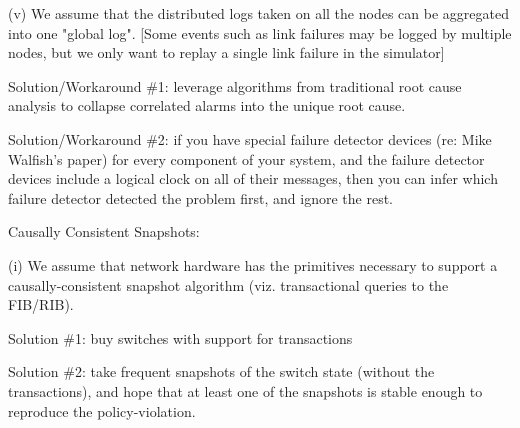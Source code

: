 (v) We assume that the distributed logs taken on all the nodes can be aggregated into one "global log". [Some events such as link failures may be logged by multiple nodes, but we only want to replay a single link failure in the simulator]

Solution/Workaround \#1: leverage algorithms from traditional root cause analysis to collapse correlated alarms into the unique root cause.

Solution/Workaround \#2: if you have special failure detector devices (re: Mike Walfish's paper) for every component of your system, and the failure detector devices include a logical clock on all of their messages, then you can infer which failure detector detected the problem first, and ignore the rest.                                                            





Causally Consistent Snapshots:                                                                                  

(i) We assume that network hardware has the primitives necessary to support a causally-consistent snapshot algorithm (viz. transactional queries to the FIB/RIB).                                                                     

Solution \#1: buy switches with support for transactions

Solution \#2:  take frequent snapshots of the switch state (without the transactions), and hope that at least one of the snapshots is stable enough to reproduce the policy-violation.

